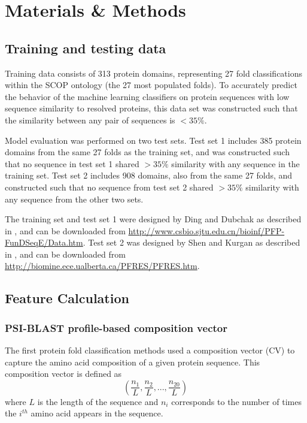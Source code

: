 \documentclass{bioinfo}
\begin{document}
\section*{Materials \& Methods}

\subsection*{Training and testing data}
Training data consists of 313 protein domains, representing 27 fold classifications within the SCOP ontology \citep{Andreeva} (the 27 most populated folds).
To accurately predict the behavior of the machine learning classifiers on protein sequences with low sequence similarity to resolved proteins, this data set was constructed such that the similarity between any pair of sequences is $<35\%$.

Model evaluation was performed on two test sets.
Test set 1 includes 385 protein domains from the same 27 folds as the training set, and was constructed such that no sequence in test set 1 shared $>35\%$ similarity with any sequence in the training set.
Test set 2 includes 908 domains, also from the same 27 folds, and constructed such that no sequence from test set 2 shared $>35\%$ similarity with any sequence from the other two sets.

The training set and test set 1 were designed by Ding and Dubchak as described in \citep{Ding,Shen}, and can be downloaded from \url{http://www.csbio.sjtu.edu.cn/bioinf/PFP-FunDSeqE/Data.htm}.
Test set 2 was designed by Shen and Kurgan as described in \citep{Chen}, and can be downloaded from \url{http://biomine.ece.ualberta.ca/PFRES/PFRES.htm}.

\subsection*{Feature Calculation}

\subsubsection*{PSI-BLAST profile-based composition vector}
The first protein fold classification methods used a composition vector (CV) to capture the amino acid composition of a given protein sequence.
This composition vector is defined as
\[ \left(\frac{n_1}{L}, \frac{n_2}{L},...,\frac{n_{20}}{L} \right) \]
where $L$ is the length of the sequence and $n_i$ corresponds to the number of times the $i^{th}$ amino acid appears in the sequence.
\end{document}
